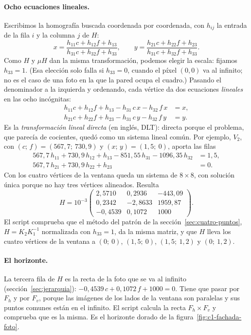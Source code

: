 \paragraph{Ocho ecuaciones lineales.} Escribimos la homografía buscada coordenada por
coordenada, con \(h_{ij}\) la entrada de la fila \(i\) y la columna \(j\) de \(H\):
\[
  x=\frac{h_{11}c+h_{12}f+h_{13}}{h_{31}c+h_{32}f+h_{33}},
  \qquad
  y=\frac{h_{21}c+h_{22}f+h_{23}}{h_{31}c+h_{32}f+h_{33}} .
\]
Como \(H\) y \(\mu H\) dan la misma transformación, podemos elegir la escala: fijamos
\(h_{33}=1\). (Esa elección solo falla si \(h_{33}=0\), cuando el píxel \((0,0)\) va al infinito;
no es el caso de una foto en la que la pared ocupa el cuadro.) Pasando el denominador a la
izquierda y ordenando, cada vértice da dos ecuaciones \emph{lineales} en las ocho incógnitas:
\[
\begin{aligned}
  h_{11}c+h_{12}f+h_{13}-h_{31}\,c\,x-h_{32}\,f\,x&=x,\\
  h_{21}c+h_{22}f+h_{23}-h_{31}\,c\,y-h_{32}\,f\,y&=y .
\end{aligned}
\]
Es la \emph{transformación lineal directa} (en inglés, DLT): directa porque el problema, que
parecía de cocientes, quedó como un sistema lineal común. Por ejemplo, \(V_2\), con
\((c;\,f)=(567{,}7;\ 730{,}9)\) y \((x;\,y)=(1{,}5;\ 0)\), aporta las filas
\[
\begin{aligned}
  567{,}7\,h_{11}+730{,}9\,h_{12}+h_{13}-851{,}55\,h_{31}-1096{,}35\,h_{32}&=1{,}5,\\
  567{,}7\,h_{21}+730{,}9\,h_{22}+h_{23}&=0 .
\end{aligned}
\]
Con los cuatro vértices de la ventana queda un sistema de \(8\times8\), con solución única
porque no hay tres vértices alineados. Resulta
\[
  H=10^{-3}\begin{pmatrix}
  2{,}5710&0{,}2936&-443{,}09\\
  0{,}2342&-2{,}8633&1959{,}87\\
  -0{,}4539&0{,}1072&1000
  \end{pmatrix}.
\]
El script comprueba que el método del patrón de la sección~\ref{sec:cuatro-puntos},
\(H=K_2K_1^{-1}\) normalizada con \(h_{33}=1\), da la misma matriz, y que \(H\) lleva los cuatro
vértices de la ventana a \((0;\ 0)\), \((1{,}5;\ 0)\), \((1{,}5;\ 1{,}2)\) y \((0;\ 1{,}2)\).

\paragraph{El horizonte.} La tercera fila de \(H\) es la recta de la foto que se va al infinito
(sección~\ref{sec:jerarquia}): \(-0{,}4539\,c+0{,}1072\,f+1000=0\). Tiene que pasar por \(F_h\) y
por \(F_v\), porque las imágenes de los lados de la ventana son paralelas y sus puntos comunes
están en el infinito. El script calcula la recta \(F_h\times F_v\) y comprueba que es la misma.
Es el horizonte dorado de la figura~\ref{fig:c1-fachada-foto}.

